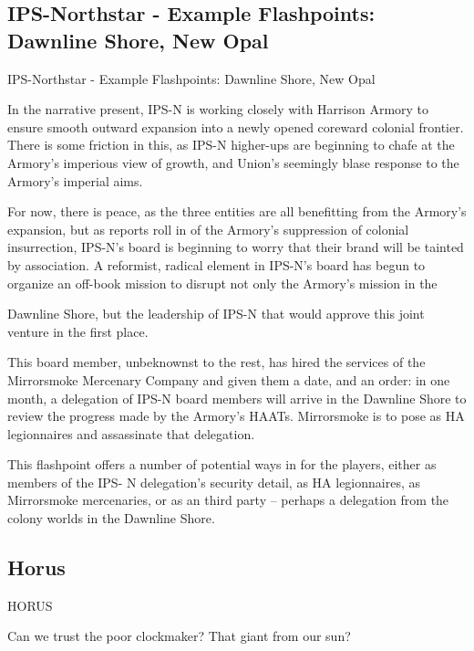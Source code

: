 \subsection{IPS-Northstar - Example Flashpoints: Dawnline Shore, New Opal  }
IPS-Northstar - Example Flashpoints: Dawnline Shore, New Opal  

In the narrative present, IPS-N is working closely with Harrison Armory to ensure smooth  
outward expansion into a newly opened coreward colonial frontier. There is some friction in this,  
as IPS-N higher-ups are beginning to chafe at the Armory’s imperious view of growth, and  
Union’s seemingly blase response to the Armory’s imperial aims. 
 

For now, there is peace, as the three entities are all benefitting from the Armory’s expansion, but  
as reports roll in of the Armory’s suppression of colonial insurrection, IPS-N’s board is beginning  
to worry that their brand will be tainted by association. A reformist, radical element in IPS-N’s  
board has begun to organize an off-book mission to disrupt not only the Armory’s mission in the  

                                                                                                           


Dawnline Shore, but the leadership of IPS-N that would approve this joint venture in the first  
place. 
 

This board member, unbeknownst to the rest, has hired the services of the Mirrorsmoke  
Mercenary Company and given them a date, and an order: in one month, a delegation of IPS-N  
board members will arrive in the Dawnline Shore to review the progress made by the Armory’s  
HAATs. Mirrorsmoke is to pose as HA legionnaires and assassinate that delegation. 
 

This flashpoint offers a number of potential ways in for the players, either as members of the IPS- 
N delegation’s security detail, as HA legionnaires, as Mirrorsmoke mercenaries, or as an third  
party -- perhaps a delegation from the colony worlds in the Dawnline Shore.     

                                                                                                           
\subsection{Horus}

HORUS   

                                     Can we trust the poor clockmaker? That giant from our  
                                    sun?   


